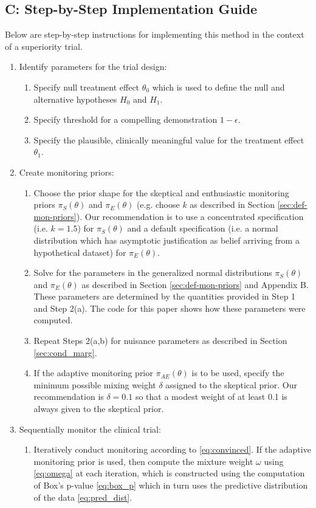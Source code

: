 \documentclass[12pt]{article}
\begin{document}
\begin{mdframed}[hidealllines=true,backgroundcolor=yellow]
\subsection*{C: Step-by-Step Implementation Guide}
Below are step-by-step instructions for implementing this method in the context of a superiority trial.
\begin{enumerate}
\item Identify parameters for the trial design:
\begin{enumerate}
\item Specify null treatment effect $\theta_0$ which is used to define the null and alternative hypotheses $H_0$ and $H_1$.
\item Specify threshold for a compelling demonstration $1-\epsilon$.
\item Specify the plausible, clinically meaningful value for the treatment effect $\theta_1$.
\end{enumerate}
\item Create monitoring priors:
\begin{enumerate}
\item Choose the prior shape for the skeptical and enthusiastic monitoring priors $\pi_S(\theta)$ and $\pi_E(\theta)$ (e.g. choose $k$ as described in Section \ref{sec:def-mon-priors}). Our recommendation is to use a concentrated specification (i.e. $k=1.5$)  for $\pi_S(\theta)$ and a default specification (i.e. a normal distribution which has asymptotic justification as belief arriving from a hypothetical dataset) for $\pi_E(\theta)$.
\item Solve for the parameters in the generalized normal distributions $\pi_S(\theta)$ and $\pi_E(\theta)$ as described in Section \ref{sec:def-mon-priors} and Appendix B. These parameters are determined by the quantities provided in Step 1 and Step 2(a). The code for this paper shows how these parameters were computed.
\item Repeat Steps 2(a,b) for nuisance parameters as described in Section \ref{sec:cond_marg}.
\item If the adaptive monitoring prior $\pi_{AE}(\theta)$ is to be used, specify the minimum possible mixing weight $\delta$ assigned to the skeptical prior. Our recommendation is $\delta=0.1$ so that a modest weight of at least 0.1 is always given to the skeptical prior.
\end{enumerate}
\item Sequentially monitor the clinical trial:
\begin{enumerate}
\item Iteratively conduct monitoring according to \eqref{eq:convinced}. If the adaptive monitoring prior is used, then compute the mixture weight $\omega$ using \eqref{eq:omega} at each iteration, which is constructed using the computation of Box's p-value \eqref{eq:box_p} which in turn uses the predictive distribution of the data \eqref{eq:pred_dist}.
\end{enumerate}
\end{enumerate}
\end{mdframed}
\end{document}

